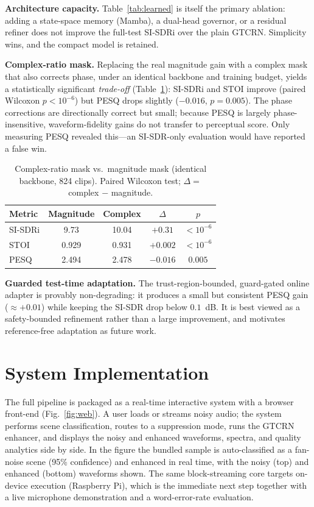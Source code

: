 \documentclass[runningheads]{llncs}
\newcommand{\pos}[1]{\textcolor{good}{\textbf{#1}}}
\newcommand{\bad}[1]{\textcolor{bad}{#1}}
\begin{document}
\textbf{Architecture capacity.} Table~\ref{tab:learned} is itself the primary
ablation: adding a state-space memory (Mamba), a dual-head governor, or a
residual refiner does not improve the full-test SI-SDRi over the plain GTCRN.
Simplicity wins, and the compact model is retained.

\textbf{Complex-ratio mask.} Replacing the real magnitude gain with a complex
mask that also corrects phase, under an identical backbone and training budget,
yields a statistically significant \emph{trade-off}
(Table~\ref{tab:complex}): SI-SDRi and STOI improve
(paired Wilcoxon $p<10^{-6}$) but PESQ drops slightly ($-0.016$, $p=0.005$).
The phase corrections are directionally correct but small; because PESQ is
largely phase-insensitive, waveform-fidelity gains do not transfer to
perceptual score. Only measuring PESQ revealed this---an SI-SDR-only evaluation
would have reported a false win.

\begin{table}[t]
\centering
\caption{Complex-ratio mask vs.\ magnitude mask (identical backbone, 824 clips).
Paired Wilcoxon test; $\Delta =$ complex $-$ magnitude.}
\label{tab:complex}
\setlength{\tabcolsep}{7pt}
\begin{tabular}{lcccc}
\toprule
Metric & Magnitude & Complex & $\Delta$ & $p$ \\
\midrule
SI-SDRi & 9.73 & 10.04 & \pos{$+0.31$} & $<10^{-6}$ \\
STOI    & 0.929 & 0.931 & \pos{$+0.002$} & $<10^{-6}$ \\
PESQ    & 2.494 & 2.478 & \bad{$-0.016$} & $0.005$ \\
\bottomrule
\end{tabular}
\end{table}

\textbf{Guarded test-time adaptation.} The trust-region-bounded, guard-gated
online adapter is provably non-degrading: it produces a small but consistent
PESQ gain ($\approx +0.01$) while keeping the SI-SDR drop below $0.1$~dB. It is
best viewed as a safety-bounded refinement rather than a large improvement, and
motivates reference-free adaptation as future work.

\section{System Implementation}\label{sec:system}
The full pipeline is packaged as a real-time interactive system with a browser
front-end (Fig.~\ref{fig:web}). A user loads or streams noisy audio; the system
performs scene classification, routes to a suppression mode, runs the GTCRN
enhancer, and displays the noisy and enhanced waveforms, spectra, and quality
analytics side by side. In the figure the bundled sample is auto-classified as
a fan-noise scene (95\% confidence) and enhanced in real time, with the noisy
(top) and enhanced (bottom) waveforms shown. The same block-streaming core
targets on-device execution (Raspberry Pi), which is the immediate next step
together with a live microphone demonstration and a word-error-rate evaluation.
\end{document}
